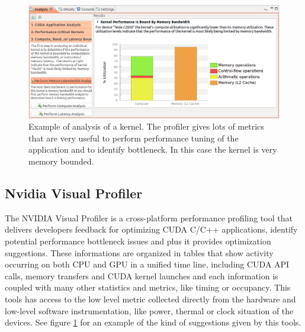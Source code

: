 \begin{figure}
\centering
\includegraphics[scale=0.4]{./images/analysis-view.png}
\caption{Example of analysis of a kernel. The profiler gives
lots of metrics that are very useful to perform performance
tuning of the application and to identify bottleneck. In this
case the kernel is very memory bounded.}\label{profiler}
\end{figure}
\subsection{Nvidia Visual Profiler}

The NVIDIA Visual Profiler is a cross-platform performance profiling tool that
delivers developers feedback for optimizing CUDA C/C++ applications, identify
potential performance bottleneck issues and plus it provides optimization suggestions.
These informations are organized in tables that show activity occurring on both
CPU and GPU in a unified time line, including CUDA API calls, memory transfers
and CUDA kernel launches and each information is coupled with many other
statistics and metrics, like timing or occupancy.
This tools has access to the low level metric collected directly from the
hardware and low-level software instrumentation, like power, thermal or clock
situation of the devices.
See figure \ref{profiler} for an example of the kind of suggestions given by
this tools.
